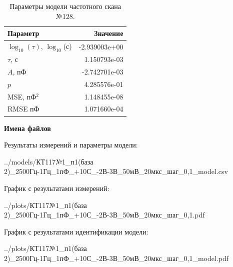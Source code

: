 \begin{table}[!ht]
    \centering
    \caption{Параметры модели частотного скана №128.}
    \begin{tabular}{|l|r|}
        \hline
        Параметр                                       & Значение                  \\ \hline
        $\log_{10}(\tau)$, $\log_{10}$(с)              & -2.939003e+00             \\ \hline
        $\tau$, с                                      & 1.150793e-03              \\ \hline
        $A$, пФ                                        & -2.742701e-03             \\ \hline
        $p$                                            & 4.285576e-01              \\ \hline
        MSE, пФ$^2$                                    & 1.148455e-08              \\ \hline
        RMSE пФ                                        & 1.071660e-04              \\ \hline
    \end{tabular}
    \label{table:frequency_scan_model_128}
\end{table}

\textbf{Имена файлов}

Результаты измерений и параметры модели:

\scriptsize../models/КТ117№1\_п1(база 2)\_2500Гц-1Гц\_1пФ\_+10С\_-2В-3В\_50мВ\_20мкс\_шаг\_0,1\_model.csv
\normalsize

График с результатами измерений:

\scriptsize../plots/КТ117№1\_п1(база 2)\_2500Гц-1Гц\_1пФ\_+10С\_-2В-3В\_50мВ\_20мкс\_шаг\_0,1.pdf
\normalsize

График с результатами идентификации модели:

\scriptsize../plots/КТ117№1\_п1(база 2)\_2500Гц-1Гц\_1пФ\_+10С\_-2В-3В\_50мВ\_20мкс\_шаг\_0,1\_model.pdf
\normalsize

